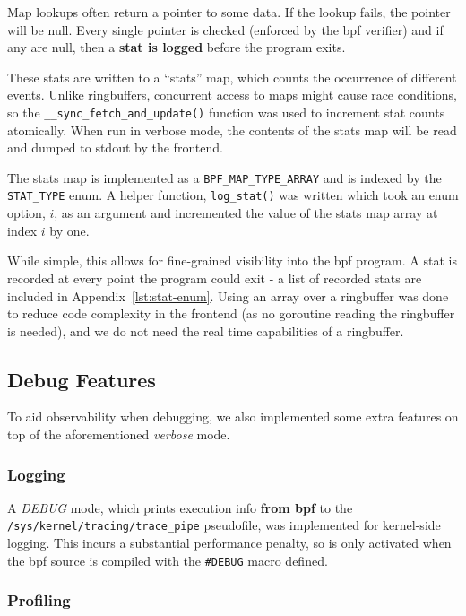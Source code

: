 Map lookups often return a pointer to some data. If the lookup fails, the
pointer will be null. Every single pointer is checked (enforced by the \ac{bpf}
verifier) and if any are null, then a \textbf{stat is logged} before the program
exits.

These stats are written to a ``stats'' map, which counts the occurrence of
different events. Unlike ringbuffers, concurrent access to maps might cause race
conditions, so the \texttt{\_\_sync\_fetch\_and\_update()} function was used to
increment stat counts atomically. When run in verbose mode, the contents of the
stats map will be read and dumped to \ac{stdout} by the frontend.

The stats map is implemented as a \texttt{BPF\_MAP\_TYPE\_ARRAY} and is indexed
by the \texttt{STAT\_TYPE} enum. A helper function, \texttt{log\_stat()} was
written which took an enum option, $i$, as an argument and incremented the value
of the stats map array at index $i$ by one.

While simple, this allows for fine-grained visibility into the \ac{bpf} program.
A stat is recorded at every point the program could exit - a list of recorded
stats are included in Appendix~\ref{lst:stat-enum}. Using an array over a
ringbuffer was done to reduce code complexity in the frontend (as no goroutine
reading the ringbuffer is needed), and we do not need the real time capabilities
of a ringbuffer.

\subsection{Debug Features}

To aid observability when debugging, we also implemented some extra features
on top of the aforementioned \textit{verbose} mode.

\subsubsection{Logging}

A \textit{DEBUG} mode,
which prints execution info \textbf{from \ac{bpf}} to the
\texttt{/sys/kernel/tracing/trace\_pipe} pseudofile, was implemented for
kernel-side logging. This incurs a substantial performance penalty, so is only
activated when the \ac{bpf} source is compiled with the \texttt{\#DEBUG} macro
defined.

\subsubsection{Profiling}


